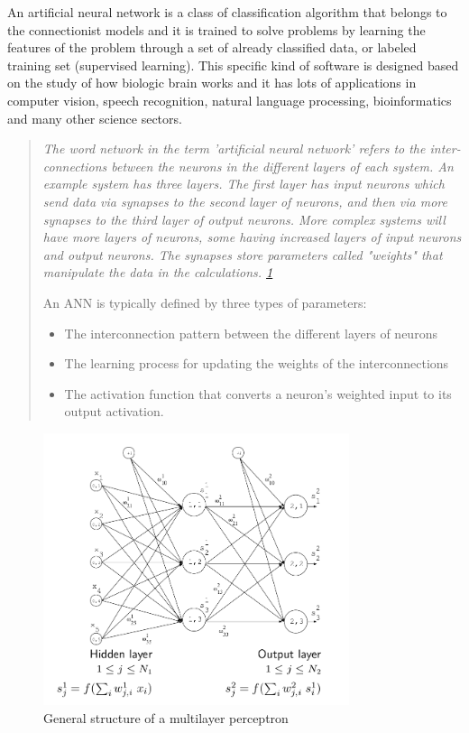 \documentclass[a4paper,openany,oneside,12pt]{book}
\begin{document}
An artificial neural network is a class of classification algorithm that belongs to the connectionist models and it is trained to solve problems by learning the features of the problem through a set of already classified data, or labeled training set (supervised learning). This specific kind of software is designed based on the study of how biologic brain works and it has lots of applications in computer vision, speech recognition, natural language processing, bioinformatics and many other science sectors.


\begin{quote}
\em The word network in the term 'artificial neural network' refers to the inter-connections between the neurons in the different layers of each system. An example system has three layers. The first layer has input neurons which send data via synapses to the second layer of neurons, and then via more synapses to the third layer of output neurons. More complex systems will have more layers of neurons, some having increased layers of input neurons and output neurons. The synapses store parameters called "weights" that manipulate the data in the calculations. \ref{fig:neuralnet}

An ANN is typically defined by three types of parameters:
\begin{itemize}
\item The interconnection pattern between the different layers of neurons
\item The learning process for updating the weights of the interconnections
\item The activation function that converts a neuron's weighted input to its output activation.
\cite{wiki:ann}
\end{itemize}
\end{quote}


\begin{figure}
\centering
\includegraphics[width=0.8\textwidth]{img/neuralNet.png} 
\caption{General structure of a multilayer perceptron\cite{rparedesNN}} \label{fig:neuralnet}
\end{figure}
\end{document}
